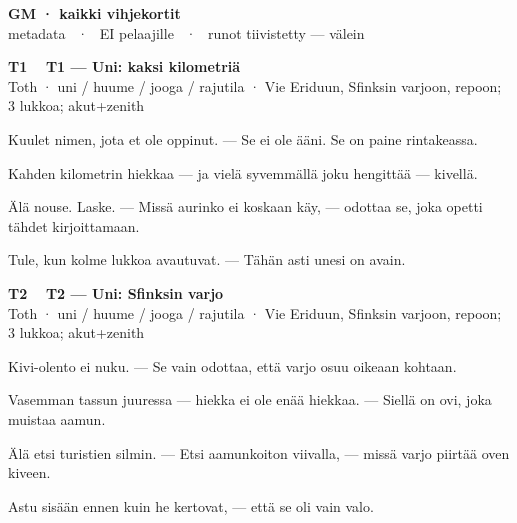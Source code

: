 \documentclass[a4paper,11pt]{article}
\begin{document}
\begin{center}
{\Large\bfseries GM · kaikki vihjekortit}\\[0.1em]
{\small metadata \ · \ EI pelaajille \ · \ runot tiivistetty --- välein}
\end{center}
\vspace{0.8mm}

\noindent
\begin{tcolorbox}[
  colframe=tothcol,
  colback=white,
  boxrule=0.8pt,
  arc=0pt,
  outer arc=0pt,
  left=2.5mm, right=2.5mm, top=2mm, bottom=2mm,
  boxsep=0.5mm,
  sharp corners,
  enhanced,
  breakable=false
]
{\large\ttfamily\bfseries T1}~~
{\normalsize\bfseries T1 --- Uni: kaksi kilometriä}\\[0.2em]
{\small\color{black!65} Toth · uni / huume / jooga / rajutila · Vie Eriduun, Sfinksin varjoon, repoon; 3 lukkoa; akut+zenith}\\[0.35em]
{\normalsize\raggedright Kuulet nimen, jota et ole oppinut. --- Se ei ole ääni. Se on paine rintakeassa.

Kahden kilometrin hiekkaa --- ja vielä syvemmällä joku hengittää --- kivellä.

Älä nouse. Laske. --- Missä aurinko ei koskaan käy, --- odottaa se, joka opetti tähdet kirjoittamaan.

Tule, kun kolme lukkoa avautuvat. --- Tähän asti unesi on avain.}
\end{tcolorbox}

\filbreak
\vspace{0.9mm}
\noindent
\begin{tcolorbox}[
  colframe=tothcol,
  colback=white,
  boxrule=0.8pt,
  arc=0pt,
  outer arc=0pt,
  left=2.5mm, right=2.5mm, top=2mm, bottom=2mm,
  boxsep=0.5mm,
  sharp corners,
  enhanced,
  breakable=false
]
{\large\ttfamily\bfseries T2}~~
{\normalsize\bfseries T2 --- Uni: Sfinksin varjo}\\[0.2em]
{\small\color{black!65} Toth · uni / huume / jooga / rajutila · Vie Eriduun, Sfinksin varjoon, repoon; 3 lukkoa; akut+zenith}\\[0.35em]
{\normalsize\raggedright Kivi-olento ei nuku. --- Se vain odottaa, että varjo osuu oikeaan kohtaan.

Vasemman tassun juuressa --- hiekka ei ole enää hiekkaa. --- Siellä on ovi, joka muistaa aamun.

Älä etsi turistien silmin. --- Etsi aamunkoiton viivalla, --- missä varjo piirtää oven kiveen.

Astu sisään ennen kuin he kertovat, --- että se oli vain valo.}
\end{tcolorbox}
\end{document}
